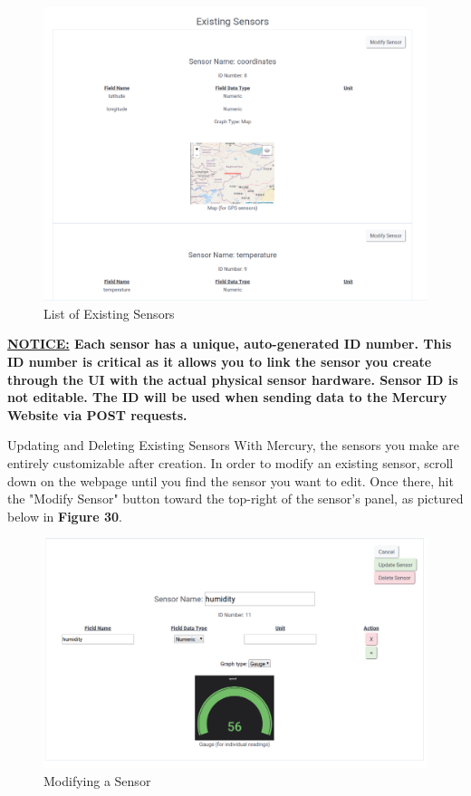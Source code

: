 \documentclass[12pt, letterpaper]{article}
\begin{document}
{{{{{{{{{{{\begin{figure}[h!]
	\centering
	\includegraphics[width=1\columnwidth]{assets/existing_sensors.png}
	\caption{List of Existing Sensors}
	\end{figure}	
	
\newpage \par \textbf{\underline{NOTICE:}  Each sensor has a unique, auto-generated ID number. This ID number is critical as it allows you to link the sensor you create through the UI with the actual physical sensor hardware. Sensor ID is not editable. The ID will be used when sending data to the Mercury Website via POST requests.}
\par Updating and Deleting Existing Sensors
With Mercury, the sensors you make are entirely customizable after creation. In order to modify an existing sensor, scroll down on the webpage until you find the sensor you want to edit. Once there, hit the "Modify Sensor" button toward the top-right of the sensor's panel, as pictured below in \textbf{Figure 30}.
\begin{figure}[h!]
	\centering
	\includegraphics[width=1\columnwidth]{assets/modify_sensor_clicked.png}
	\caption{Modifying a Sensor}
	\end{figure}	

}}}}}}}}}}}
\end{document}
